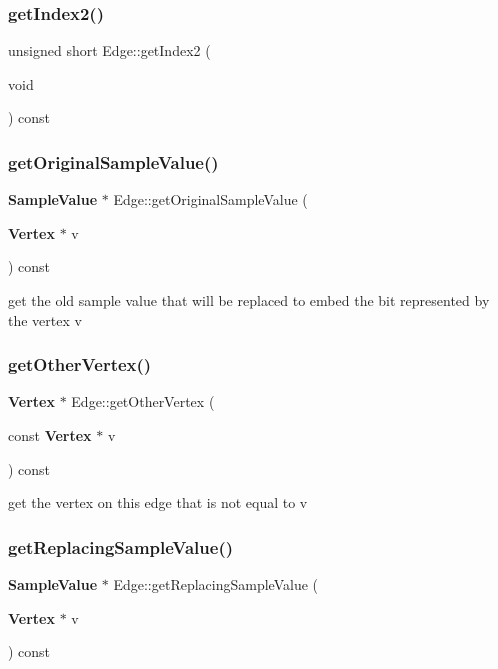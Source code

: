\subsubsection{get\+Index2()}
{\footnotesize\ttfamily unsigned short Edge\+::get\+Index2 (\begin{DoxyParamCaption}\item[{void}]{ }\end{DoxyParamCaption}) const\hspace{0.3cm}{\ttfamily [inline]}}

\mbox{\label{classEdge_ac68dfbcc1e393685e9de05237215ae0c}} 
\subsubsection{get\+Original\+Sample\+Value()}
{\footnotesize\ttfamily \textbf{ Sample\+Value} $\ast$ Edge\+::get\+Original\+Sample\+Value (\begin{DoxyParamCaption}\item[{\textbf{ Vertex} $\ast$}]{v }\end{DoxyParamCaption}) const}

get the old sample value that will be replaced to embed the bit represented by the vertex v \mbox{\label{classEdge_a58ed07f0227bcd3cc96782f953c94c0b}} 
\subsubsection{get\+Other\+Vertex()}
{\footnotesize\ttfamily \textbf{ Vertex} $\ast$ Edge\+::get\+Other\+Vertex (\begin{DoxyParamCaption}\item[{const \textbf{ Vertex} $\ast$}]{v }\end{DoxyParamCaption}) const}

get the vertex on this edge that is not equal to v \mbox{\label{classEdge_a63017c10332e6c064134bbab26a27011}} 
\subsubsection{get\+Replacing\+Sample\+Value()}
{\footnotesize\ttfamily \textbf{ Sample\+Value} $\ast$ Edge\+::get\+Replacing\+Sample\+Value (\begin{DoxyParamCaption}\item[{\textbf{ Vertex} $\ast$}]{v }\end{DoxyParamCaption}) const}

